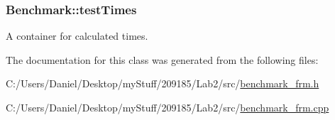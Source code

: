 \subsubsection[{test\+Times}]{\setlength{\rightskip}{0pt plus 5cm}Benchmark\+::test\+Times\hspace{0.3cm}{\ttfamily [private]}}\label{class_benchmark_a5563f218941d6b01ac7783f1e6582025}


A container for calculated times. 



The documentation for this class was generated from the following files\+:\begin{DoxyCompactItemize}
\item 
C\+:/\+Users/\+Daniel/\+Desktop/my\+Stuff/209185/\+Lab2/src/\hyperlink{benchmark__frm_8h}{benchmark\+\_\+frm.\+h}\item 
C\+:/\+Users/\+Daniel/\+Desktop/my\+Stuff/209185/\+Lab2/src/\hyperlink{benchmark__frm_8cpp}{benchmark\+\_\+frm.\+cpp}\end{DoxyCompactItemize}
